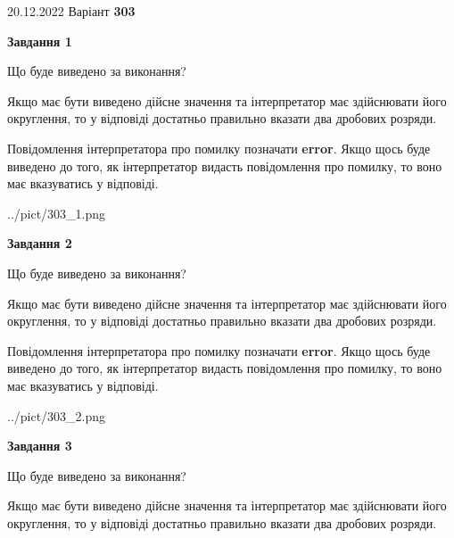 \documentclass[12pt, ukrainian]{article}
\begin{document}
{20.12.2022 Варіант \No \textbf { 303 }\par}
{
\begin {Large}

{\begin {center}\textbf{Завдання 1}\end {center}}\par
Що буде виведено за виконання? \par

Якщо має бути виведено дійсне значення та інтерпретатор має здійснювати його округлення, 
то у відповіді достатньо правильно вказати два дробових розряди.

Повідомлення інтерпретатора про помилку позначати \textbf{error}.
Якщо щось буде виведено до того, як інтерпретатор видасть повідомлення про помилку, 
то воно має вказуватись у відповіді. \par

\begin{center}
	{../pict/303_1.png}
\end{center}
\newpage

{\begin {center}\textbf{Завдання 2}\end {center}}\par
Що буде виведено за виконання? \par

Якщо має бути виведено дійсне значення та інтерпретатор має здійснювати його округлення, 
то у відповіді достатньо правильно вказати два дробових розряди.

Повідомлення інтерпретатора про помилку позначати \textbf{error}.
Якщо щось буде виведено до того, як інтерпретатор видасть повідомлення про помилку, 
то воно має вказуватись у відповіді. \par

\begin{center}
	{../pict/303_2.png}
\end{center}
\newpage

{\begin {center}\textbf{Завдання 3}\end {center}}\par
Що буде виведено за виконання? \par

Якщо має бути виведено дійсне значення та інтерпретатор має здійснювати його округлення, 
то у відповіді достатньо правильно вказати два дробових розряди.


\end{Large}}
\end{document}
